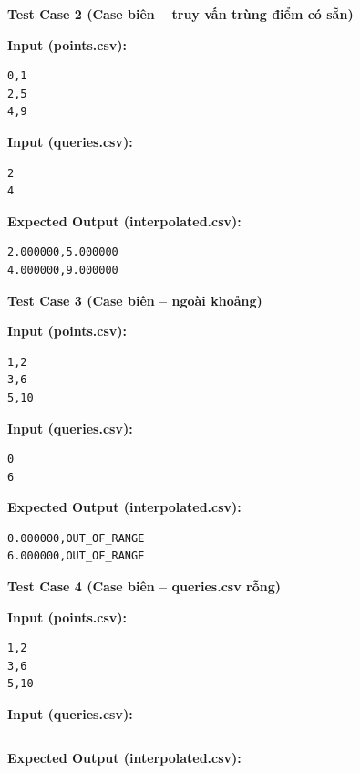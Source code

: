 \vspace{0.5cm}

\textbf{Test Case 2 (Case biên -- truy vấn trùng điểm có sẵn)}

\textbf{Input (points.csv):}
\begin{lstlisting}
0,1
2,5
4,9
\end{lstlisting}

\textbf{Input (queries.csv):}
\begin{lstlisting}
2
4
\end{lstlisting}

\textbf{Expected Output (interpolated.csv):}
\begin{lstlisting}
2.000000,5.000000
4.000000,9.000000
\end{lstlisting}

\vspace{0.5cm}

\textbf{Test Case 3 (Case biên -- ngoài khoảng)}

\textbf{Input (points.csv):}
\begin{lstlisting}
1,2
3,6
5,10
\end{lstlisting}

\textbf{Input (queries.csv):}
\begin{lstlisting}
0
6
\end{lstlisting}

\textbf{Expected Output (interpolated.csv):}
\begin{lstlisting}
0.000000,OUT_OF_RANGE
6.000000,OUT_OF_RANGE
\end{lstlisting}

\vspace{0.5cm}

\textbf{Test Case 4 (Case biên -- queries.csv rỗng)}

\textbf{Input (points.csv):}
\begin{lstlisting}
1,2
3,6
5,10
\end{lstlisting}

\textbf{Input (queries.csv):}
\begin{lstlisting}
\end{lstlisting}

\textbf{Expected Output (interpolated.csv):}
\begin{lstlisting}
\end{lstlisting}